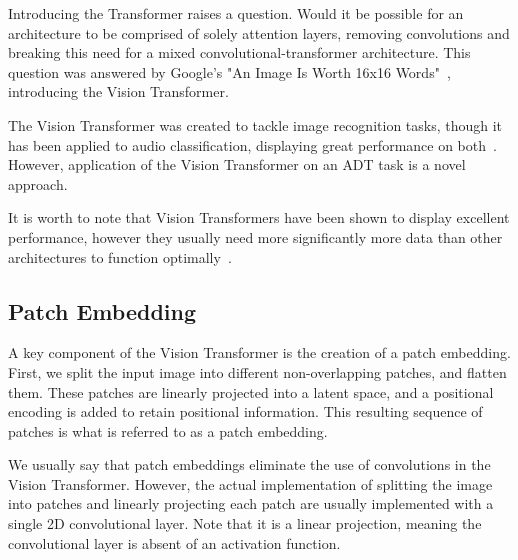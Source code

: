 Introducing the Transformer raises a question. Would it be possible for an architecture to be comprised of solely attention layers, removing convolutions and breaking this need for a mixed convolutional-transformer architecture. This question was answered by Google's "An Image Is Worth 16x16 Words"~\cite{dosovitskiy2021imageworth16x16words}, introducing the Vision Transformer.

The Vision Transformer was created to tackle image recognition tasks, though it has been applied to audio classification, displaying great performance on both~\cite{dosovitskiy2021imageworth16x16words, gong2021astaudiospectrogramtransformer}. However, application of the Vision Transformer on an \gls{ADT} task is a novel approach.

It is worth to note that Vision Transformers have been shown to display excellent performance, however they usually need more significantly more data than other architectures to function optimally~\cite{dosovitskiy2021imageworth16x16words}.

\subsection{Patch Embedding}

A key component of the Vision Transformer is the creation of a patch embedding. First, we split the input image into different non-overlapping patches, and flatten them. These patches are linearly projected into a latent space, and a positional encoding is added to retain positional information. This resulting sequence of patches is what is referred to as a patch embedding.

We usually say that patch embeddings eliminate the use of convolutions in the Vision Transformer. However, the actual implementation of splitting the image into patches and linearly projecting each patch are usually implemented with a single 2D convolutional layer. Note that it is a linear projection, meaning the convolutional layer is absent of an activation function.

